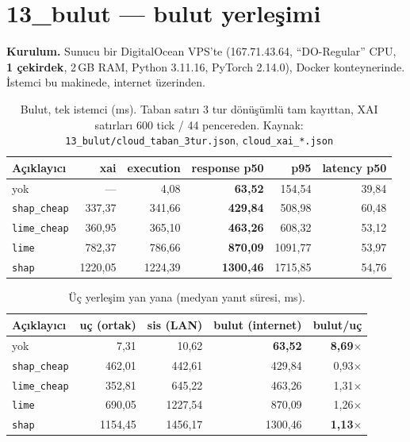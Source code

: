 \documentclass[11pt,a4paper]{report}
\newcommand{\kod}[1]{\texttt{\small #1}}
\newcommand{\dosya}[1]{\texttt{\footnotesize #1}}
\begin{document}
\section{13\_bulut --- bulut yerleşimi}

\textbf{Kurulum.} Sunucu bir DigitalOcean VPS'te (167.71.43.64, ``DO-Regular''
CPU, \textbf{1 çekirdek}, 2\,GB RAM, Python 3.11.16, PyTorch 2.14.0),
Docker konteynerinde. İstemci bu makinede, internet üzerinden.

\begin{table}[H]
\centering\small
\begin{tabular}{@{}lrrrrr@{}}
\toprule
\textbf{Açıklayıcı} & \textbf{xai} & \textbf{execution} & \textbf{response p50} & \textbf{p95} & \textbf{latency p50} \\
\midrule
yok               & ---       & 4{,}08  & \textbf{63{,}52}  & 154{,}54 & 39{,}84 \\
\kod{shap\_cheap} & 337{,}37  & 341{,}66 & \textbf{429{,}84} & 508{,}98 & 60{,}48 \\
\kod{lime\_cheap} & 360{,}95  & 365{,}10 & \textbf{463{,}26} & 608{,}32 & 53{,}12 \\
\kod{lime}        & 782{,}37  & 786{,}66 & \textbf{870{,}09} & 1091{,}77 & 53{,}97 \\
\kod{shap}        & 1220{,}05 & 1224{,}39 & \textbf{1300{,}46} & 1715{,}85 & 54{,}76 \\
\bottomrule
\end{tabular}
\caption{Bulut, tek istemci (ms). Taban satırı 3 tur dönüşümlü tam kayıttan,
XAI satırları 600 tick / 44 pencereden.
Kaynak: \dosya{13\_bulut/cloud\_taban\_3tur.json}, \dosya{cloud\_xai\_*.json}}
\end{table}

\begin{table}[H]
\centering\small
\begin{tabular}{@{}lrrrr@{}}
\toprule
\textbf{Açıklayıcı} & \textbf{uç (ortak)} & \textbf{sis (LAN)} & \textbf{bulut (internet)} & \textbf{bulut/uç} \\
\midrule
yok               & 7{,}31   & 10{,}62  & \textbf{63{,}52}  & \textbf{8{,}69$\times$} \\
\kod{shap\_cheap} & 462{,}01 & 442{,}61 & 429{,}84 & 0{,}93$\times$ \\
\kod{lime\_cheap} & 352{,}81 & 645{,}22 & 463{,}26 & 1{,}31$\times$ \\
\kod{lime}        & 690{,}05 & 1227{,}54 & 870{,}09 & 1{,}26$\times$ \\
\kod{shap}        & 1154{,}45 & 1456{,}17 & 1300{,}46 & \textbf{1{,}13$\times$} \\
\bottomrule
\end{tabular}
\caption{Üç yerleşim yan yana (medyan yanıt süresi, ms).}
\label{tab:yerlesim}
\end{table}
\end{document}
